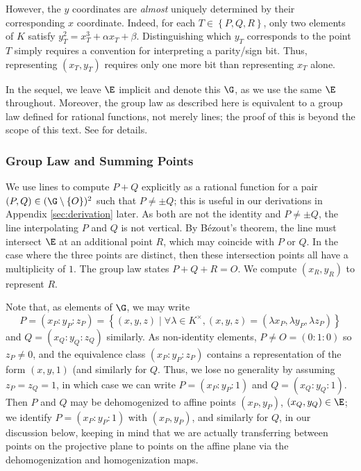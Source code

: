 \documentclass[11pt,letterpaper]{article}
\theoremstyle{definition}
\newcommand{\6}{\mathbf}
\newcommand{\7}{\mathcal}
\begin{document}

However, the $y$ coordinates are \textit{almost} uniquely determined by their corresponding $x$ coordinate. Indeed, for each $T \in \left\{P, Q, R\right\}$, only two elements of $K$ satisfy $y_T^2 = x_T^3 + \alpha x_T + \beta$. Distinguishing which $y_T$ corresponds to the point $T$ simply requires a convention for interpreting a parity/sign bit.
Thus, representing $(x_T,y_T)$ requires only one more bit than representing $x_T$ alone.

In the sequel, we leave $\E$ implicit and denote this $\G$, as we use the same $\E$ throughout. Moreover, the group law as described here is equivalent to a group law defined for rational functions, not merely lines; the proof of this is beyond the scope of this text. See \cite{Silverman} for details.

\subsubsection{Group Law and Summing Points}\label{subsec:detail}

We use lines to compute $P + Q$ explicitly as a rational function for a pair $(P, Q) \in (\G \setminus \left\{O\right\})^2$ such that $P \neq \pm Q$; this is useful in our derivations in Appendix \ref{sec:derivation} later. As both are not the identity and $P \neq \pm Q$, the line interpolating $P$ and $Q$ is not vertical. By B\'{e}zout's theorem, the line must intersect $\E$ at an additional point $R$, which may coincide with $P$ or $Q$. In the case where the three points are distinct, then these intersection points all have a multiplicity of $1$. The group law states $P + Q + R = O$. 
We compute $(x_R, y_R)$ to represent $R$.


Note that, as elements of $\G$, we may write \[P = (x_P\!:\!y_P\!:\!z_P) = \left\{(x,y,z) \mid \forall \lambda \in K^\times, (x,y,z) = (\lambda x_P,\lambda y_P,\lambda z_P)\right\}\] and $Q = (x_Q\!:\!y_Q\!:\!z_Q)$ similarly. As non-identity elements, $P \neq O = (0\!:\!1\!:\!0)$ so $z_P \neq 0$, and the equivalence class $(x_P\!:\!y_P\!:\!z_P)$ contains a representation of the form $(x,y,1)$ (and similarly for $Q$. Thus, we lose no generality by assuming $z_P=z_Q=1$, in which case we can write $P = (x_P\!:\!y_P\!:\!1)$ and $Q=(x_Q\!:\!y_Q\!:\!1)$. Then $P$ and $Q$ may be dehomogenized to affine points $(x_P, y_P)$, $(x_Q, y_Q) \in \E$; we identify $P = (x_P\!:\!y_P\!:\!1)$ with $(x_P, y_P)$, and similarly for $Q$, in our discussion below, keeping in mind that we are actually transferring between points on the projective plane to points on the affine plane via the dehomogenization and homogenization maps.
\end{document}
